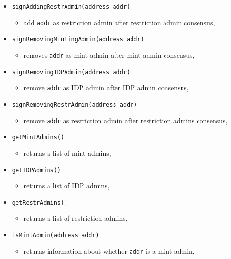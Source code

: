 \documentclass[12pt]{article}
\begin{document}
\begin{itemize}
\begin{itemize}
        \end{itemize}
    \item \texttt{signAddingRestrAdmin(address addr)}
        \begin{itemize}
            \item[] add \texttt{addr} as restriction admin after restriction admin consensus,
        \end{itemize}
    \item \texttt{signRemovingMintingAdmin(address addr)}
        \begin{itemize}
            \item[] removes \texttt{addr} as mint admin after mint admin consensus,
        \end{itemize}
    \item \texttt{signRemovingIDPAdmin(address addr)}
        \begin{itemize}
            \item[] remove \texttt{addr} as IDP admin after IDP admin consensus,
        \end{itemize}
    \item \texttt{signRemovingRestrAdmin(address addr)}
        \begin{itemize}
            \item[] remove \texttt{addr} as restriction admin after restriction admins consensus,
        \end{itemize}
    \item \texttt{getMintAdmins()}
        \begin{itemize}
            \item[] returns a list of mint admins,
        \end{itemize}
    \item \texttt{getIDPAdmins()}
        \begin{itemize}
            \item[] returns a list of IDP admins,
        \end{itemize}
    \item \texttt{getRestrAdmins()}
        \begin{itemize}
            \item[] returns a list of restriction admins,
        \end{itemize}
    \item \texttt{isMintAdmin(address addr)}
        \begin{itemize}
            \item[] returns information about whether \texttt{addr} is a mint admin,

\end{itemize}
\end{itemize}
\end{document}
